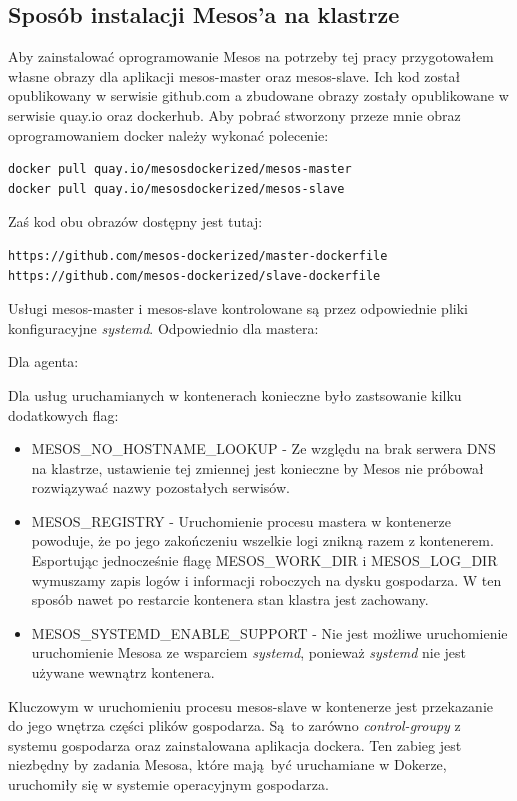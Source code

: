 \documentclass[10pt,a4paper,titlepage,twoside]{report}
\begin{document}
\subsection{Sposób instalacji Mesos'a na klastrze}
Aby zainstalować oprogramowanie Mesos na potrzeby tej pracy przygotowałem własne obrazy dla aplikacji mesos-master oraz mesos-slave. Ich kod został opublikowany w serwisie github.com a zbudowane obrazy zostały opublikowane w serwisie quay.io oraz dockerhub. Aby pobrać stworzony przeze mnie obraz oprogramowaniem docker należy wykonać polecenie:
\begin{lstlisting}
docker pull quay.io/mesosdockerized/mesos-master
docker pull quay.io/mesosdockerized/mesos-slave
\end{lstlisting}

Zaś kod obu obrazów dostępny jest tutaj:
\begin{lstlisting}
https://github.com/mesos-dockerized/master-dockerfile
https://github.com/mesos-dockerized/slave-dockerfile
\end{lstlisting}

Usługi mesos-master i mesos-slave kontrolowane są przez odpowiednie pliki konfiguracyjne \textit{systemd}. Odpowiednio dla mastera:


Dla agenta:


Dla usług uruchamianych w kontenerach konieczne było zastsowanie kilku dodatkowych flag:
\begin{itemize}
\item MESOS\_NO\_HOSTNAME\_LOOKUP - Ze względu na brak serwera DNS na klastrze, ustawienie tej zmiennej jest konieczne by Mesos nie próbował rozwiązywać nazwy pozostałych serwisów. 
\item MESOS\_REGISTRY - Uruchomienie procesu mastera w kontenerze powoduje, że po jego zakończeniu wszelkie logi znikną razem z kontenerem. Esportując jednocześnie flagę MESOS\_WORK\_DIR i MESOS\_LOG\_DIR wymuszamy zapis logów i informacji roboczych na dysku gospodarza. W ten sposób nawet po restarcie kontenera stan klastra jest zachowany.
\item MESOS\_SYSTEMD\_ENABLE\_SUPPORT - Nie jest możliwe uruchomienie uruchomienie Mesosa ze wsparciem \textit{systemd}, ponieważ \textit{systemd} nie jest używane wewnątrz kontenera.
\end{itemize}
Kluczowym w uruchomieniu procesu mesos-slave w kontenerze jest przekazanie do jego wnętrza części plików gospodarza. Są to zarówno \textit{control-groupy} z systemu gospodarza oraz zainstalowana aplikacja dockera. Ten zabieg jest niezbędny by zadania Mesosa, które mają być uruchamiane w Dokerze, uruchomiły się w systemie operacyjnym gospodarza.
\end{document}
